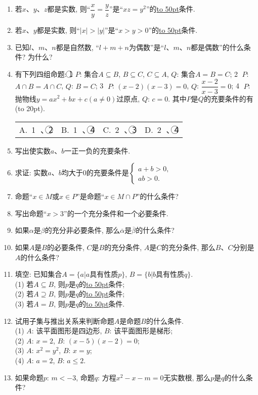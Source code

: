 \documentclass[10pt,a4paper]{article}
\newcommand{\blank}[1]{\underline{\hbox to #1pt{}}}
\newcommand{\bracket}[1]{(\hbox to #1pt{})}
\newcommand{\fourch}[4]{\par\begin{tabular}{p{.23\textwidth}p{.23\textwidth}p{.23\textwidth}p{.23\textwidth}}
A.~#1 &B.~#2& C.~#3& D.~#4
\end{tabular}}
\begin{document}
\begin{enumerate}[1.]
\item 若$x$、$y$、$z$都是实数, 则``$\dfrac xy=\dfrac yz$''是``$xz=y^2$''的\blank{50}条件.
\item 若$x$、$y$都是实数, 则``$|x|>|y|$''是``$x>y>0$''的\blank{50}条件.
\item 已知$l$、$m$、$n$都是自然数, ``$l+m+n$为偶数''是``$l$、$m$、$n$都是偶数''的什么条件? 为什么?
\item 有下列四组命题:
\textcircled{1} $P$: 集合$A\subseteq B$, $B\subseteq C$, $C\subseteq A$, 		$Q$: 集合$A=B=C$;
\textcircled{2} $P$: $A\cap B=A\cap C$, 					$Q$: $B=C$;
\textcircled{3} $P$: $(x-2)(x-3)=0$, 				$Q$: $\dfrac{x-2}{x-3}=0$;
\textcircled{4} $P$: 抛物线$y=ax^2+bx+c(a\ne 0)$过原点, $Q$: $c=0$.
其中$P$是$Q$的充要条件的有\bracket{20}.
\fourch{\textcircled{1} 、\textcircled{2} }{\textcircled{1} 、\textcircled{4} }{\textcircled{2} 、\textcircled{3} }{\textcircled{2} 、\textcircled{4}}
\item 写出使实数$a$、$b$一正一负的充要条件.
\item 求证: 实数$a$、$b$均大于$0$的充要条件是$\begin{cases} a+b>0, \\ ab>0. \end{cases}$
\item 命题``$x\in M$或$x\in P$''是命题``$x\in M\cap P$''的什么条件?
\item 写出命题``$x>3$''的一个充分条件和一个必要条件.
\item 如果$\alpha$是$\beta$的充分非必要条件, 那么$\overline{\alpha }$是$\overline{\beta }$的什么条件?
\item 如果$A$是$B$的必要条件, $C$是$B$的充分条件, $A$是$C$的充分条件, 那么$B$、$C$分别是$A$的什么条件?
\item 填空:
已知集合$A=\{a|a$具有性质$p\}$, $B=\{b|b$具有性质$q\}$.\\
(1) 若$A\subseteq B$, 则$p$是$q$的\blank{50}条件;\\
(2) 若$A\supseteq B$, 则$p$是$q$的\blank{50}条件;\\
(3) 若$A=B$, 则$p$是$q$的\blank{50}条件.
\item 试用子集与推出关系来判断命题$A$是命题$B$的什么条件.\\
(1) $A$: 该平面图形是四边形, $B$: 该平面图形是梯形;\\
(2) $A$: $x=2$, $B$: $(x-5)(x-2)=0$;\\
(3) $A$: $x^2=y^2$, $B$: $x=y$;\\
(4) $A$: $a=2$, $B$: $a\le 2$.
\item 如果命题$p$: $m<-3$, 命题$q$: 方程$x^2-x-m=0$无实数根, 那么$p$是$q$的什么条件?

\end{enumerate}
\end{document}

